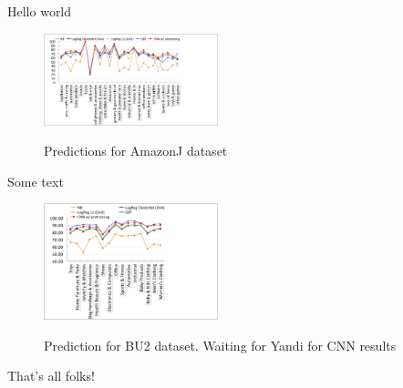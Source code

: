 Hello world

\begin{figure}
\centering
\includegraphics[width=0.45\textwidth]{images/amazonj-WUC-predictions}
\label{Figure_amazonj-WUC-predictions}
\caption{Predictions for AmazonJ dataset}
\end{figure}

Some text
\vspace{7cm}

\begin{figure}
\centering
\includegraphics[width=0.45\textwidth]{images/BU2-WUC-predictions}
\label{Figure_BU2-WUC-predictions}
\caption{Prediction for BU2 dataset. Waiting for Yandi for CNN results}
\end{figure}

That's all folks!